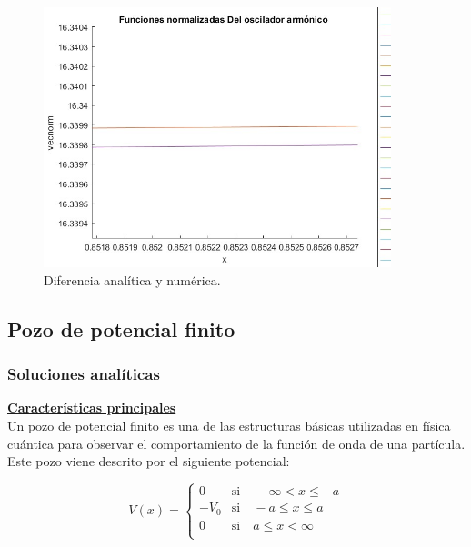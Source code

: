 \documentclass[12pt]{article}
\begin{document}
    \begin{figure}[H]
        \centering
        \includegraphics[width=0.9\textwidth]{fotos/diferenciaentrefunciones.jpg}
        \caption{Diferencia analítica y numérica.}
        \label{PolinomiosHermite}
    \end{figure}

    \subsection{Pozo de potencial finito}
    
    \subsubsection{Soluciones analíticas}
    
    \textbf{\underline{Características principales}}\\
    
Un pozo de potencial finito es una de las estructuras básicas utilizadas
en física cuántica para observar el comportamiento de la función
de onda de una partícula. Este pozo viene descrito por el siguiente 
potencial:

\begin{equation}
V(x)=\begin{cases} 
    0 & \text{si} \quad -\infty < x \leq -a \\
    -V_0 & \text{si} \quad -a\leq x \leq a \\
    0 & \text{si} \quad a \leq x < \infty \\
 \end{cases}
\end{equation}
\end{document}

